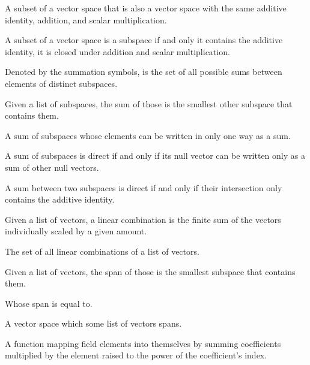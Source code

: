 \begin{multicols}{3}

  A subset of a vector space that is also a vector space with the same additive identity, addition, and scalar multiplication.
  
  A subset of a vector space is a subspace if and only it contains the additive identity,
  it is closed under addition and scalar multiplication.

  Denoted by the summation symbols, is the set of all possible sums between elements of distinct subspaces.
  
  Given a list of subspaces, the sum of those is the smallest other subspace that contains them.
  
  A sum of subspaces whose elements can be written in only one way as a sum.
  
  A sum of subspaces is direct if and only if its null vector can be written only as a sum of other null vectors.

  A sum between two subspaces is direct if and only if their intersection only contains the additive identity.

  Given a list of vectors, a linear combination is the finite sum of the vectors individually scaled by a given amount.
  
  The set of all linear combinations of a list of vectors.
  
  Given a list of vectors, the span of those is the smallest subspace that contains them.
  
  Whose span is equal to.
  
  A vector space which some list of vectors spans.
  
  A function mapping field elements into themselves by summing coefficients multiplied by the element raised to the power of the coefficient's index.
  

\end{multicols}

